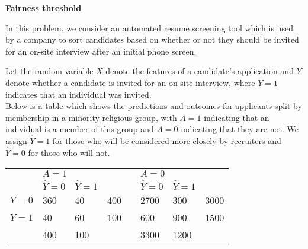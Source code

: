\documentclass[12pt, addpoints]{exam}
\begin{document}
\begin{questions}
\begin{parts}
\end{parts}

\question[25] \textbf{Fairness threshold}

In this problem, we consider an automated resume screening tool which is used by a company to sort candidates based on whether or not they should be invited for an on-site interview after an initial phone screen.

Let the random variable $X$ denote the features of a candidate's application and $Y$ denote whether a candidate is invited for an on site interview, where $Y=1$ indicates that an individual was invited.\\
 
Below is a table which shows the predictions and outcomes for applicants split by membership in a minority religious group, with $A=1$ indicating that an individual is a member of this group and $A=0$ indicating that they are not. We assign $\widehat Y=1$ for those who will be considered more closely by recruiters and $\widehat Y=0$ for those who will not.
\begin{center}
\begin{tabular}{l|l|l|ll|l|l|l}
\cline{2-3} \cline{6-7}
           & \multicolumn{2}{l|}{$A=1$}            &                                                  &  & \multicolumn{2}{l|}{$A=0$}         &                                                  \\ \cline{2-3} \cline{6-7}
           & $\widehat Y=0 $               & $\widehat Y=1$              &                                                  &  & $\widehat Y=0 $               & $\widehat Y=1$                &                                                  \\ \cline{1-4} \cline{6-8} 
\multicolumn{1}{|l|}{\textbf{$Y=0$}} & 360                         & 40                          & \multicolumn{1}{l|}{400} &  & 2700                         & 300                         & \multicolumn{1}{l|}{3000} \\ \cline{1-4} \cline{6-8} 
\multicolumn{1}{|l|}{\textbf{$Y=1$}} & 40                          & 60                         & \multicolumn{1}{l|}{100} &  & 600                          & 900                         & \multicolumn{1}{l|}{1500} \\ \cline{1-4} \cline{6-8} 
       & 400 & 100 &                                                  &  & 3300 & 1200 &                                                  \\ \cline{2-3} \cline{6-7}
\end{tabular}
\end{center}
\begin{parts}

\end{parts}
\end{questions}
\end{document}

